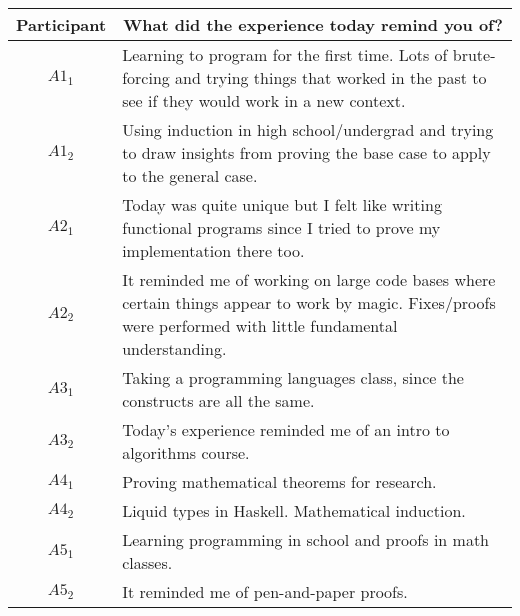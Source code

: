 \noindent
\begin{tabularx}{\linewidth}{@{}cX@{}}
  \toprule
  Participant & \multicolumn{1}{c}{
    \textbf{What did the experience today remind you of?}
  } \\ \midrule
  $A1_{1}$ & Learning to program for the first time. Lots of brute-forcing and trying things that worked in the past to see if they would work in a new context. \\
  $A1_{2}$ & Using induction in high school/undergrad and trying to draw insights from proving the base case to apply to the general case. \\
  $A2_{1}$ & Today was quite unique but I felt like writing functional programs since I tried to prove my implementation there too. \\
  $A2_{2}$ & It reminded me of working on large code bases where certain things appear to work by magic.  Fixes/proofs were performed with little fundamental understanding. \\
  $A3_{1}$ & Taking a programming languages class, since the constructs are all the same. \\
  $A3_{2}$ & Today's experience reminded me of an intro to algorithms course. \\
  $A4_{1}$ & Proving mathematical theorems for research. \\
  $A4_{2}$ & Liquid types in Haskell.  Mathematical induction. \\
  $A5_{1}$ & Learning programming in school and proofs in math classes. \\
  $A5_{2}$ & It reminded me of pen-and-paper proofs. \\
  \bottomrule
\end{tabularx}{\parfillskip=0pt\par}

\clearpage

